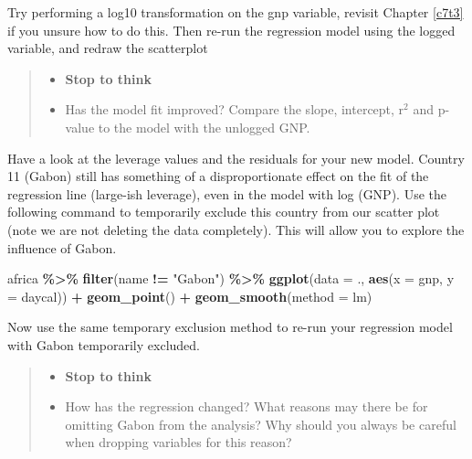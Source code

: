 \documentclass[
]{book}
\newenvironment{Shaded}{\begin{snugshade}}{\end{snugshade}}
\newcommand{\AttributeTok}[1]{\textcolor[rgb]{0.13,0.29,0.53}{#1}}
\newcommand{\FunctionTok}[1]{\textcolor[rgb]{0.13,0.29,0.53}{\textbf{#1}}}
\newcommand{\NormalTok}[1]{#1}
\newcommand{\SpecialCharTok}[1]{\textcolor[rgb]{0.81,0.36,0.00}{\textbf{#1}}}
\newcommand{\StringTok}[1]{\textcolor[rgb]{0.31,0.60,0.02}{#1}}
\providecommand{\tightlist}{%
  \setlength{\itemsep}{0pt}\setlength{\parskip}{0pt}}
\begin{document}
Try performing a log10 transformation on the gnp variable, revisit Chapter \ref{c7t3} if you unsure how to do this. Then re-run the regression model using the logged variable, and redraw the scatterplot

\begin{quote}
\begin{itemize}
\tightlist
\item
  \textbf{Stop to think}
\item
  Has the model fit improved? Compare the slope, intercept, r\(^2\) and p-value to the model with the unlogged GNP.
\end{itemize}
\end{quote}

Have a look at the leverage values and the residuals for your new model. Country 11 (Gabon) still has something of a disproportionate effect on the fit of the regression line (large-ish leverage), even in the model with log (GNP). Use the following command to temporarily exclude this country from our scatter plot (note we are not deleting the data completely). This will allow you to explore the influence of Gabon.

\begin{Shaded}
\begin{Highlighting}[]
\NormalTok{africa }\SpecialCharTok{\%\textgreater{}\%}
  \FunctionTok{filter}\NormalTok{(name }\SpecialCharTok{!=} \StringTok{"Gabon"}\NormalTok{) }\SpecialCharTok{\%\textgreater{}\%}
  \FunctionTok{ggplot}\NormalTok{(}\AttributeTok{data =}\NormalTok{ ., }\FunctionTok{aes}\NormalTok{(}\AttributeTok{x =}\NormalTok{ gnp, }\AttributeTok{y =}\NormalTok{ daycal)) }\SpecialCharTok{+}
  \FunctionTok{geom\_point}\NormalTok{() }\SpecialCharTok{+}
  \FunctionTok{geom\_smooth}\NormalTok{(}\AttributeTok{method =}\NormalTok{ lm)}
\end{Highlighting}
\end{Shaded}

Now use the same temporary exclusion method to re-run your regression model with Gabon temporarily excluded.

\begin{quote}
\begin{itemize}
\tightlist
\item
  \textbf{Stop to think}
\item
  How has the regression changed? What reasons may there be for omitting Gabon from the analysis? Why should you always be careful when dropping variables for this reason?
\end{itemize}
\end{quote}
\end{document}
